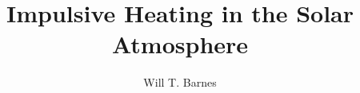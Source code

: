 \documentclass[12pt]{ruthesis}
\title{Impulsive Heating in the Solar Atmosphere}
\author{Will T. Barnes}
\begin{document}
  \begin{frontmatter}
   \maketitle
   
   \tableofcontents
   \listoffigures
   \listoftables
%   
  \end{frontmatter}




\appendix

%
%
%
%



\end{document}

